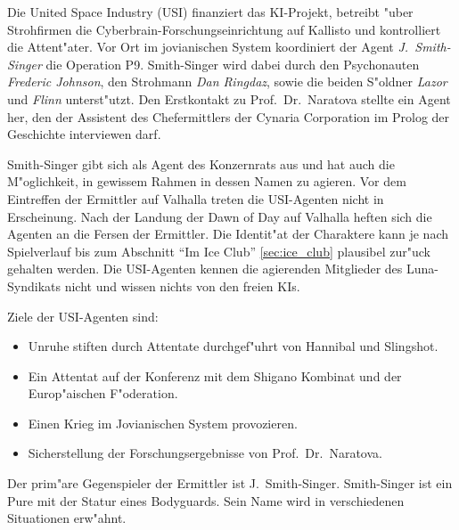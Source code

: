 
Die United Space Industry (USI) finanziert das KI-Projekt, betreibt "uber Strohfirmen die Cyberbrain-Forschungseinrichtung auf Kallisto und kontrolliert die Attent"ater. Vor Ort im jovianischen System koordiniert der Agent \emph{J.~Smith-Singer} die Operation P9. Smith-Singer wird dabei durch den Psychonauten \emph{Frederic Johnson}, den Strohmann \emph{Dan Ringdaz}, sowie die beiden S"oldner \emph{Lazor} und \emph{Flinn} unterst"utzt. Den Erstkontakt zu Prof.~Dr.~Naratova stellte ein Agent her, den der Assistent des Chefermittlers der Cynaria Corporation im Prolog der Geschichte interviewen darf.

Smith-Singer gibt sich als Agent des Konzernrats aus und hat auch die M"oglichkeit, in gewissem Rahmen in dessen Namen zu agieren. Vor dem Eintreffen der Ermittler auf Valhalla treten die USI-Agenten nicht in Erscheinung. Nach der Landung der Dawn of Day auf Valhalla heften sich die Agenten an die Fersen der Ermittler. Die Identit"at der Charaktere kann je nach Spielverlauf bis zum Abschnitt  ``Im Ice Club'' \cref{sec:ice_club} plausibel zur"uck gehalten werden. Die USI-Agenten kennen die agierenden Mitglieder des Luna-Syndikats nicht und wissen nichts von den freien KIs.

Ziele der USI-Agenten sind:

\begin{itemize}
    \item Unruhe stiften durch Attentate durchgef"uhrt von Hannibal und Slingshot.
    \item Ein Attentat auf der Konferenz mit dem Shigano Kombinat und der Europ"aischen F"oderation.
    \item Einen Krieg im Jovianischen System provozieren.
    \item Sicherstellung der Forschungsergebnisse von  Prof.~Dr.~Naratova.
\end{itemize}

Der prim"are Gegenspieler der Ermittler ist J.~Smith-Singer. Smith-Singer ist ein Pure mit der Statur eines Bodyguards. Sein Name wird in verschiedenen Situationen erw"ahnt.
\vfill
\pagebreak

